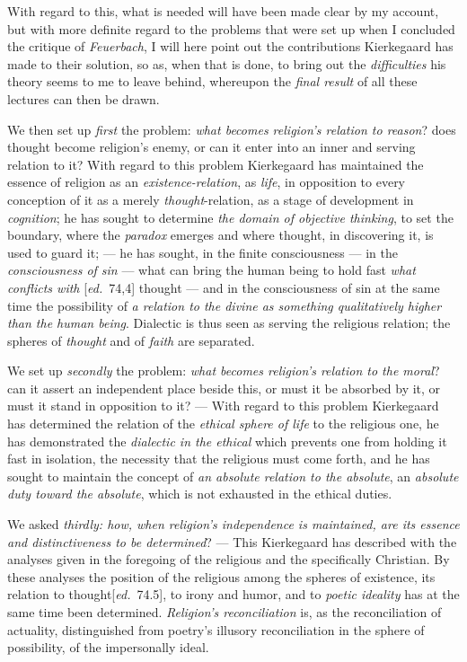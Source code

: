 \documentclass[12pt,a4paper,openany]{book}
\newcommand{\kpage}[1]{\marginnote{\footnotesize\textit{[#1]}}}
\newcommand{\ed}[1]{{\small[\textit{ed.}\ #1]}}
\begin{document}
With regard to this, what is needed will have been made clear by my account,
but with more definite regard to the problems that were
set up when I concluded the critique of \emph{Feuerbach}, I will here point out
the contributions Kierkegaard has made to their solution, so as, when
that is done, to bring out the \emph{difficulties} his theory seems
to me to leave behind, whereupon the \emph{final result} of all these lectures
can then be drawn.

We then set up \emph{first} the problem: \emph{what becomes religion's relation
to reason}? does thought become religion's enemy, or can it
enter into an inner and serving relation to it? With regard to this
problem Kierkegaard has maintained the essence of religion as an \emph{existence-relation},
as \emph{life}, in opposition to every conception of it
as a merely \emph{thought}-relation, as a stage of development in \emph{cognition}; he
has sought to determine \emph{the domain of objective thinking}, to set the boundary\kpage{164},
where the \emph{paradox} emerges and where thought, in discovering
it, is used to guard it; --- he has sought, in the finite consciousness
--- in the \emph{consciousness of sin} --- what can bring the human being to
hold fast \emph{what conflicts with} \ed{74,4} thought --- and in the consciousness of sin
at the same time the possibility of \emph{a relation to the divine as something qualitatively
higher than the human being}. Dialectic is thus seen as serving the
religious relation; the spheres of \emph{thought} and of \emph{faith} are separated.

We set up \emph{secondly} the problem: \emph{what becomes religion's relation
to the moral}? can it assert an independent place beside
this, or must it be absorbed by it, or must it stand in opposition
to it? --- With regard to this problem Kierkegaard
has determined the relation of the \emph{ethical sphere of life} to the religious one, he has demonstrated
the \emph{dialectic in the ethical} which prevents one from holding it fast in isolation,
the necessity that the religious must come forth, and he has
sought to maintain the concept of \emph{an absolute relation to the absolute}, an \emph{absolute
duty toward the absolute}, which is not exhausted in the ethical duties.

We asked \emph{thirdly: how, when religion's independence
is maintained, are its essence and distinctiveness to be determined}? --- This Kierkegaard
has described with the analyses given in the foregoing
of the religious and the specifically Christian. By these analyses
the position of the religious among the spheres of existence, its relation
to thought\ed{74.5}, to irony and humor, and to \emph{poetic ideality}
has at the same time been determined. \emph{Religion's reconciliation} is, as the reconciliation of actuality, distinguished
from poetry's illusory reconciliation in the sphere of possibility, of the impersonally
ideal.
\end{document}
